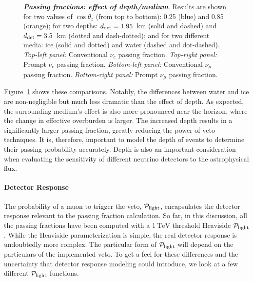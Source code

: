 \begin{figure}[h!]
{	}
	\caption{\textbf{\textit{Passing fractions: effect of depth/medium}}. Results are shown for two values of $\cos\theta_z$ (from top to bottom): 0.25 (blue) and 0.85 (orange); for two depths: $d_{\rm det} = 1.95$~km (solid and dashed) and $d_{\rm det} = 3.5$~km (dotted and dash-dotted); and for two different media: ice (solid and dotted) and water (dashed and dot-dashed). \textit{Top-left panel:} Conventional $\nu_e$ passing fraction. \textit{Top-right panel:} Prompt $\nu_e$ passing fraction. \textit{Bottom-left panel:} Conventional $\nu_\mu$ passing fraction. \textit{Bottom-right panel:} Prompt $\nu_\mu$ passing fraction.} \vspace{1.5cm}
	\label{fig:medium-effect}
\end{figure}

Figure~\ref{fig:medium-effect} shows these comparisons.
Notably, the differences between water and ice are non-negligible but much less dramatic than the effect of depth.
As expected, the surrounding medium's effect is also more pronounced near the horizon, where the change in effective overburden is larger.
The increased depth results in a significantly larger passing fraction, greatly reducing the power of veto techniques.
It is, therefore, important to model the depth of events to determine their passing probability accurately.
Depth is also an important consideration when evaluating the sensitivity of different neutrino detectors to the astrophysical flux.

\paragraph{Detector Response}
The probability of a muon to trigger the veto, ${\mathcal P}_{\rm light}$, encapsulates the detector response relevant to the passing fraction calculation.
So far, in this discussion, all the passing fractions have been computed with a $\SI{1}\TeV$ threshold Heaviside ${\mathcal P}_{\rm light}$.
While the Heaviside parameterization is simple, the real detector response is undoubtedly more complex.
The particular form of ${\mathcal P}_{\rm light}$ will depend on the particulars of the implemented veto.
To get a feel for these differences and the uncertainty that detector response modeling could introduce, we look at a few different ${\mathcal P}_{\rm light}$ functions.

